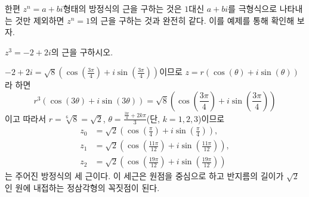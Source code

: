 \documentclass[11pt, a4paper]{book}
\begin{document}
한편 $z^{n} =a+bi$형태의 방정식의 근을 구하는 것은 $1$대신 $a+bi$를 극형식으로 나타내는 것만 제외하면 $z^{n}=1$의 근을 구하는 것과 완전히 같다. 이를 예제를 통해 확인해 보자.
\vspace{1em}
\begin{example}
	$z^{3}= -2 +2i$의 근을 구하시오.
	\begin{solution}
	$-2+2i=\sqrt{8}\left(\cos\left(\frac{3\pi}{4}\right)+i \sin\left(\frac{3\pi}{4}\right)\right)$이므로 $z =r(\cos(\theta)+i\sin(\theta))$라 하면
	\begin{equation*}
		r^{3}(\cos(3\theta)+i \sin(3\theta)) =\sqrt{8}\left(\cos\left(\frac{3\pi}{4}\right)+i \sin\left(\frac{3\pi}{4}\right)\right)
	\end{equation*}
이고 따라서 $r=\sqrt[6]{8}=\sqrt{2}$, $\theta =\frac{\frac{3\pi}{4}+2k\pi}{3}$(단, $k=1, 2, 3$)이므로
\begin{align*}
	z_{0} &= \sqrt{2} \left(\cos\left(\frac{\pi}{4}\right)+i \sin\left(\frac{\pi}{4}\right)\right),\\
		z_{1}&= \sqrt{2} \left(\cos\left(\frac{11\pi}{12}\right)+i \sin\left(\frac{11\pi}{12}\right)\right), \\
		 z_{2} &= \sqrt{2} \left(\cos\left(\frac{19\pi}{12}\right)+i \sin\left(\frac{19\pi}{12}\right)\right)
\end{align*}
는 주어진 방정식의 세 근이다. 이 세근은 원점을 중심으로 하고 반지름의 길이가 $\sqrt{2}$인 원에 내접하는 정삼각형의 꼭짓점이 된다.
	\end{solution}
\end{example}
\vspace{1em}
\end{document}
